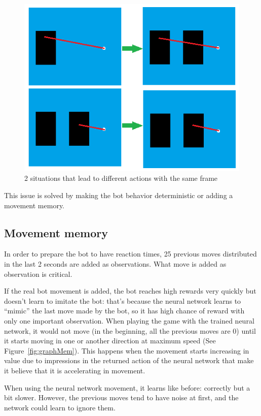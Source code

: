 \begin{figure}[h]
  \centering
		\includegraphics[width=.9\textwidth]{img/exampleDet.png}
  \caption{2 situations that lead to different actions with the same frame}
  \label{fig:graphTR}
\end{figure}

This issue is solved by making the bot behavior deterministic or adding a movement memory.

\subsection{Movement memory}
\label{sec:movememory}

In order to prepare the bot to have reaction times, 25 previous moves distributed in the last 2 seconds are added as observations. What move is added as observation is critical.

If the real bot movement is added, the bot reaches high rewards very quickly but doesn't learn to imitate the bot: that's because the neural network learns to ``mimic'' the last move made by the bot, so it has high chance of reward with only one important observation. When playing the game with the trained neural network, it would not move (in the beginning, all the previous moves are 0) until it starts moving in one or another direction at maximum speed (See Figure~\ref{fig:graphMem}). This happens when the movement starts increasing in value due to impressions in the returned action of the neural network that make it believe that it is accelerating in movement.

When using the neural network movement, it learns like before: correctly but a bit slower. However, the previous moves tend to have noise at first, and the network could learn to ignore them.

